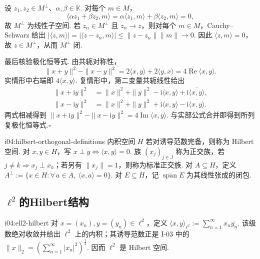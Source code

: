 \begin{FAProof}
设 \(\displaystyle z_1,z_2\in M^\perp\)、\(\displaystyle \alpha,\beta\in\mathbb K\). 对每个 \(\displaystyle m\in M\)，
\[
\langle\alpha z_1+\beta z_2,m\rangle
=\alpha\langle z_1,m\rangle+\beta\langle z_2,m\rangle=0,
\]
故 \(\displaystyle M^\perp\) 为线性子空间. 若 \(\displaystyle z_n\in M^\perp\) 且 \(\displaystyle z_n\to z\)，则对每个 \(\displaystyle m\in M\)，Cauchy--Schwarz 给出 \(\displaystyle |\langle z,m\rangle| =|\langle z-z_n,m\rangle| \leqslant\|z-z_n\|\|m\|\to0\).
因此 \(\displaystyle \langle z,m\rangle=0\)，故 \(\displaystyle z\in M^\perp\)，从而 \(\displaystyle M^\perp\) 闭.

最后核验极化恒等式. 由共轭对称性，
\[
\|x+y\|^2-\|x-y\|^2
=2\langle x,y\rangle+2\langle y,x\rangle
=4\operatorname{Re}\langle x,y\rangle.
\]
实情形中右端即 \(\displaystyle4\langle x,y\rangle\). 复情形中，第二变量共轭线性给出
\begin{align*}
\|x+\mathrm{i}y\|^2
&=\|x\|^2+\|y\|^2-\mathrm{i}\langle x,y\rangle+\mathrm{i}\overline{\langle x,y\rangle},\\
\|x-\mathrm{i}y\|^2
&=\|x\|^2+\|y\|^2+\mathrm{i}\langle x,y\rangle-\mathrm{i}\overline{\langle x,y\rangle}.
\end{align*}
两式相减得到 \(\displaystyle \|x+\mathrm{i}y\|^2-\|x-\mathrm{i}y\|^2 =4\operatorname{Im}\langle x,y\rangle\).
与实部公式合并即得到所列复极化恒等式.\hfill\(\square\)

\end{FAProof}

\begin{FADefinition}{i04:hilbert-orthogonal-definitions}
内积空间 \(\displaystyle H\) 若对诱导范数完备，则称为 Hilbert 空间. 对 \(\displaystyle x,y\in H\)，写 \(\displaystyle x\perp y\iff\langle x,y\rangle=0\). 族 \(\displaystyle (x_j)_{j\in J}\) 称为正交族，若 \(\displaystyle j\neq k\Rightarrow x_j\perp x_k\)；若另有 \(\displaystyle \|x_j\|=1\)，则称为标准正交族. 对 \(\displaystyle A\subseteq H\)，定义 \(\displaystyle A^\perp:=\{x\in H:\forall\,a\in A,\ \langle x,a\rangle=0\}\).
对 \(\displaystyle E\subseteq H\)，记 \(\displaystyle \overline{\operatorname{span}}E\) 为其线性张成的闭包.
\end{FADefinition}

\newpage
\subsection{\texorpdfstring{\(\displaystyle\ell^2\)}{ℓ^2}的Hilbert结构}

\begin{FAProposition}{i04:ell2-hilbert}
对 \(\displaystyle x=(x_n),y=(y_n)\in\ell^2\)，定义 \(\displaystyle \langle x,y\rangle_{\ell^2} :=\sum_{n=1}^{\infty}x_n\overline{y_n}\).
该级数绝对收敛并给出 \(\displaystyle \ell^2\) 上的内积；其诱导范数正是 I-03 中的 \(\displaystyle \|x\|_2=(\sum_{n=1}^{\infty}|x_n|^2)^{\frac{1}{2}}\). 因而 \(\displaystyle \ell^2\) 是 Hilbert 空间.
\end{FAProposition}

